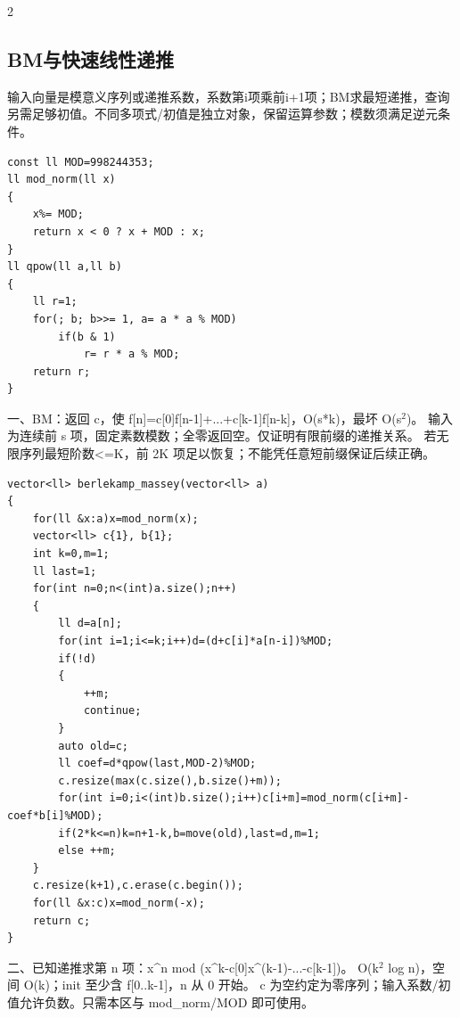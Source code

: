 \documentclass[UTF8,fontset=fandol,a4paper,twoside]{ctexart}
\newcommand{\note}[1]{{\fontsize{10}{12}\selectfont #1\par}}
\begin{document}
\begin{multicols}{2}
\subsection{BM与快速线性递推}

\note{输入向量是模意义序列或递推系数，系数第i项乘前i+\allowbreak{}1项；BM求最短递推，查询另需足够初值。不同多项式/\allowbreak{}初值是独立对象，保留运算参数；模数须满足逆元条件。}
\begin{lstlisting}
const ll MOD=998244353;
ll mod_norm(ll x)
{
    x%= MOD;
    return x < 0 ? x + MOD : x;
}
ll qpow(ll a,ll b)
{
    ll r=1;
    for(; b; b>>= 1, a= a * a % MOD)
        if(b & 1)
            r= r * a % MOD;
    return r;
}
\end{lstlisting}
\note{一、BM：返回 c，使 f[\allowbreak{}n]\allowbreak{}=\allowbreak{}c[\allowbreak{}0]\allowbreak{}f[\allowbreak{}n-\allowbreak{}1]\allowbreak{}+\allowbreak{}.\allowbreak{}.\allowbreak{}.\allowbreak{}+\allowbreak{}c[\allowbreak{}k-\allowbreak{}1]\allowbreak{}f[\allowbreak{}n-\allowbreak{}k]\allowbreak{}，O(\allowbreak{}s*k)\allowbreak{}，最坏 O(\allowbreak{}s\ensuremath{^2})\allowbreak{}。 输入为连续前 s 项，固定素数模数；全零返回空。仅证明有限前缀的递推关系。 若无限序列最短阶数<\allowbreak{}=\allowbreak{}K，前 2K 项足以恢复；不能凭任意短前缀保证后续正确。}
\begin{lstlisting}
vector<ll> berlekamp_massey(vector<ll> a)
{
    for(ll &x:a)x=mod_norm(x);
    vector<ll> c{1}, b{1};
    int k=0,m=1;
    ll last=1;
    for(int n=0;n<(int)a.size();n++)
    {
        ll d=a[n];
        for(int i=1;i<=k;i++)d=(d+c[i]*a[n-i])%MOD;
        if(!d)
        {
            ++m;
            continue;
        }
        auto old=c;
        ll coef=d*qpow(last,MOD-2)%MOD;
        c.resize(max(c.size(),b.size()+m));
        for(int i=0;i<(int)b.size();i++)c[i+m]=mod_norm(c[i+m]-coef*b[i]%MOD);
        if(2*k<=n)k=n+1-k,b=move(old),last=d,m=1;
        else ++m;
    }
    c.resize(k+1),c.erase(c.begin());
    for(ll &x:c)x=mod_norm(-x);
    return c;
}
\end{lstlisting}
\note{二、已知递推求第 n 项：x\textasciicircum{}n mod (\allowbreak{}x\textasciicircum{}k-\allowbreak{}c[\allowbreak{}0]\allowbreak{}x\textasciicircum{}(\allowbreak{}k-\allowbreak{}1)\allowbreak{}-\allowbreak{}.\allowbreak{}.\allowbreak{}.\allowbreak{}-\allowbreak{}c[\allowbreak{}k-\allowbreak{}1]\allowbreak{})\allowbreak{}。 O(\allowbreak{}k\ensuremath{^2} log n)\allowbreak{}，空间 O(\allowbreak{}k)\allowbreak{}；init 至少含 f[\allowbreak{}0.\allowbreak{}.\allowbreak{}k-\allowbreak{}1]\allowbreak{}，n 从 0 开始。 c 为空约定为零序列；输入系数/\allowbreak{}初值允许负数。只需本区与 mod\_norm/\allowbreak{}MOD 即可使用。}

\end{multicols}
\end{document}
